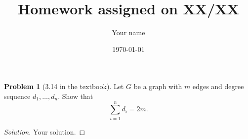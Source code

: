 \documentclass{article}
\title{Homework assigned on XX/XX}
\author{Your name}
\date{\today}
\theoremstyle{definition}
\newtheorem{problem}{Problem}
\newenvironment{solution}
{\begin{proof}[Solution]}
{\end{proof}}
\begin{document}
\maketitle
\large


\begin{problem}[3.14 in the textbook]
Let $G$ be a graph with $m$ edges and degree sequence
$d_1, \ldots, d_n$.  Show that 
\[
    \sum_{i=1}^n d_i = 2m.
\]
\end{problem}
\begin{solution}
Your solution.
\end{solution}
\end{document}
